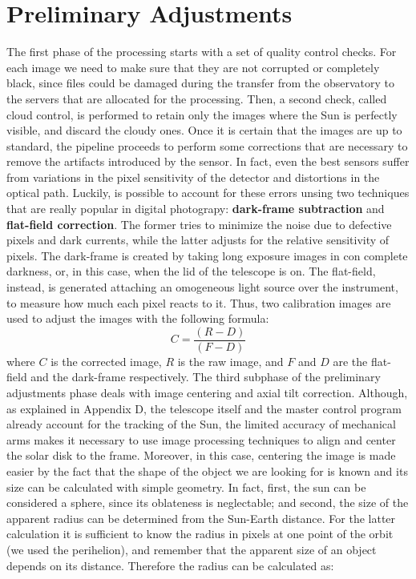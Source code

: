 \section{Preliminary Adjustments}
\noindent The first phase of the processing starts with a set of quality control checks. For each image we need to make sure that they are not corrupted or completely black, since files could be damaged during the transfer from the observatory to the servers that are allocated for the processing. Then, a second check, called cloud control, is performed to retain only the images where the Sun is perfectly visible, and discard the cloudy ones.
\bigbreak
\noindent Once it is certain that the images are up to standard, the pipeline proceeds to perform some corrections that are necessary to remove the artifacts introduced by the sensor. In fact, even the best sensors suffer from variations in the pixel sensitivity of the detector and distortions in the optical path. Luckily, is possible to account for these errors unsing two techniques that are really popular in digital photograpy: \textbf{dark-frame subtraction} and \textbf{flat-field correction}. The former tries to minimize the noise due to defective pixels and dark currents, while the latter adjusts for the relative sensitivity of pixels. The dark-frame is created by taking long exposure images in con complete darkness, or, in this case, when the lid of the telescope is on. The flat-field, instead, is generated attaching an omogeneous light source over the instrument, to measure how much each pixel reacts to it. Thus, two calibration images are used to adjust the images with the following formula:
\begin{equation}
C = \frac{(R - D)}{(F - D)}
\end{equation}
where $C$ is the corrected image, $R$ is the raw image, and $F$ and $D$ are the flat-field and the dark-frame respectively.
\bigbreak
\noindent The third subphase of the preliminary adjustments phase deals with image centering and axial tilt correction. Although, as explained in Appendix D, the telescope itself and the master control program already account for the tracking of the Sun, the limited accuracy of mechanical arms makes it necessary to use image processing techniques to align and center the solar disk to the frame. Moreover, in this case, centering the image is made easier by the fact that the shape of the object we are looking for is known and its size can be calculated with simple geometry. In fact, first, the sun can be considered a sphere, since its oblateness is neglectable; and second, the size of the apparent radius can be determined from the Sun-Earth distance. For the latter calculation it is sufficient to know the radius in pixels at one point of the orbit (we used the perihelion), and remember that the apparent size of an object depends on its distance. Therefore the radius can be calculated as:

